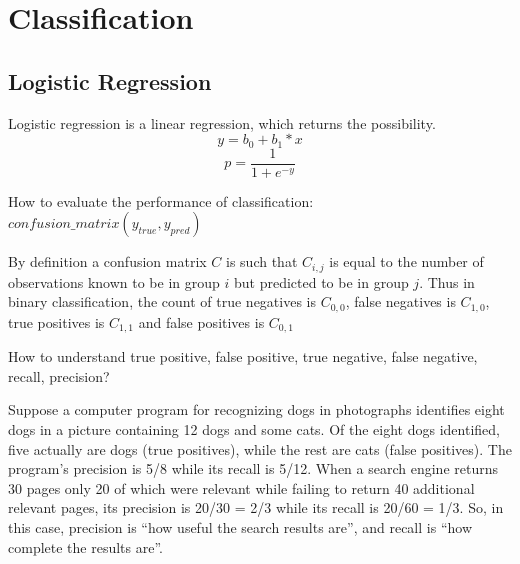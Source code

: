 \chapter{Classification}

\section{Logistic Regression}
Logistic regression is a linear regression, which returns the possibility.
\begin{equation}
y = b_0 + b_1*x
\end{equation}
\begin{equation}
p = \frac{1}{1+e^{-y}}
\end{equation}

How to evaluate the performance of classification:
$confusion\_{matrix}(y_{true}, y_{pred})$

By definition a confusion matrix $C$ is such that $C_{i, j}$ is equal to the number of observations known to be in group $i$ but predicted to be in group $j$.
Thus in binary classification, the count of true negatives is $C_{0,0}$, false negatives is $C_{1,0}$, true positives is $C_{1,1}$ and false positives is $C_{0,1}$

How to understand true positive, false positive, true negative, false negative, recall, precision?

Suppose a computer program for recognizing dogs in photographs identifies eight dogs in a picture containing 12 dogs and some cats. Of the eight dogs identified, five actually are dogs (true positives), while the rest are cats (false positives). The program's precision is 5/8 while its recall is 5/12. When a search engine returns 30 pages only 20 of which were relevant while failing to return 40 additional relevant pages, its precision is 20/30 = 2/3 while its recall is 20/60 = 1/3. So, in this case, precision is ``how useful the search results are'', and recall is ``how complete the results are''.


